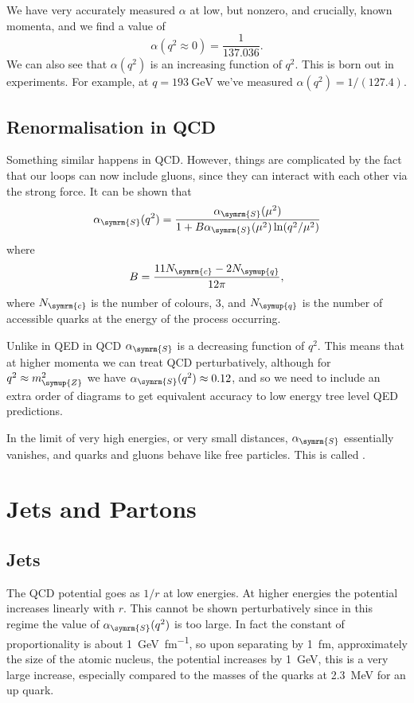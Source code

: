\documentclass[fleqn]{NotesClass}
\newcommand{\Pparticle}[1]{\symup{#1}}
\newcommand{\PZ}{\ensuremath{\Pparticle{Z}}}
\newcommand{\Pq}{\ensuremath{\Pparticle{q}}}
\newcommand{\strongForce}{\symrm{S}}
\newcommand{\numberofcolors}{N_{\symrm{c}}}
\begin{document}
    We have very accurately measured \(\alpha\) at low, but nonzero, and crucially, known momenta, and we find a value of
    \begin{equation}
        \alpha(q^2 \approx 0) = \frac{1}{137.036}.
    \end{equation}
    We can also see that \(\alpha(q^2)\) is an increasing function of \(q^2\).
    This is born out in experiments.
    For example, at \(q = \qty{193}{\giga\electronvolt}\) we've measured \(\alpha(q^2) = 1/(127.4)\).
    
    \section{Renormalisation in QCD}
    Something similar happens in QCD.
    However, things are complicated by the fact that our loops can now include gluons, since they can interact with each other via the strong force.
    It can be shown that
    \begin{equation}
        \alpha_{\strongForce}(q^2) = \frac{\alpha_{\strongForce}(\mu^2)}{1 + B \alpha_{\strongForce}(\mu^2) \ln(q^2/\mu^2)}
    \end{equation}
    where
    \begin{equation}
        B = \frac{11\numberofcolors - 2N_{\Pq}}{12\pi},
    \end{equation}
    where \(\numberofcolors\) is the number of colours, \(3\), and \(N_{\Pq}\) is the number of accessible quarks at the energy of the process occurring.
    
    Unlike in QED in QCD \(\alpha_{\strongForce}\) is a decreasing function of \(q^2\).
    This means that at higher momenta we can treat QCD perturbatively, although for \(q^2 \approx m_{\PZ}^2\) we have \(\alpha_{\strongForce}(q^2) \approx 0.12\), and so we need to include an extra order of diagrams to get equivalent accuracy to low energy tree level QED predictions.
    
    In the limit of very high energies, or very small distances, \(\alpha_{\strongForce}\) essentially vanishes, and quarks and gluons behave like free particles.
    This is called .
    
    \chapter{Jets and Partons}
    \section{Jets}
    The QCD potential goes as \(1/r\) at low energies.
    At higher energies the potential increases linearly with \(r\).
    This cannot be shown perturbatively since in this regime the value of \(\alpha_{\strongForce}(q^2)\) is too large.
    In fact the constant of proportionality is about \qty{1}{\giga\electronvolt\per\femto\metre}, so upon separating by \qty{1}{\femto\metre}, approximately the size of the atomic nucleus, the potential increases by \qty{1}{\giga\electronvolt}, this is a very large increase, especially compared to the masses of the quarks at \qty{2.3}{\mega\electronvolt} for an up quark.
    
\end{document}
